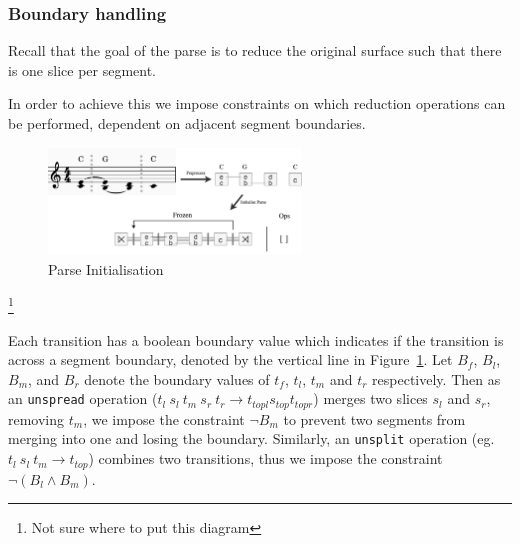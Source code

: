 \documentclass[12pt,a4paper,twoside,openright]{report}
\theoremstyle{definition}
\begin{document}
%
%
%
%
%
%

\subsubsection{Boundary handling}

Recall that the goal of the parse is to reduce the original surface such that there is one slice per segment. 

In order to achieve this we impose constraints on which reduction operations can be performed, dependent on adjacent segment boundaries. 


\begin{figure}[h]
  \centering
  \includegraphics[width=0.6\textwidth]{impl/parseInit.png}
  \caption{Parse Initialisation}
  \label{fig:parseInit}
\end{figure}\footnote{Not sure where to put this diagram}


Each transition has a boolean boundary value which indicates if the transition is across a segment boundary, denoted by the vertical line in Figure~\ref{fig:parseInit}. 
Let $B_f$, $B_l$, $B_m$, and $B_r$ denote the boundary values of $t_f$, $t_l$, $t_m$ and $t_r$ respectively. 
Then as an \texttt{unspread} operation ($t_l~s_l~t_m~s_r~t_r \to t_{topl} s_{top} t_{topr} $) merges two slices $s_l$ and $s_r$, removing $t_m$, we impose the constraint $\lnot B_m$ to prevent two segments from merging into one and losing the boundary. 
Similarly, an \texttt{unsplit} operation (eg. $t_l~s_l~t_m \to t_{top}$) combines two transitions, thus we impose the constraint $\lnot (B_l \wedge B_m)$.
\end{document}
